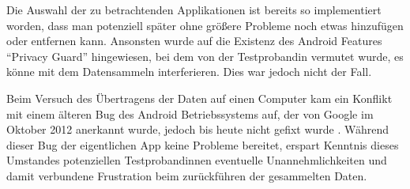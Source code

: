 Die Auswahl der zu betrachtenden Applikationen ist bereits so implementiert worden, dass man potenziell später ohne größere Probleme noch etwas hinzufügen oder entfernen kann.
Ansonsten wurde auf die Existenz des Android Features "`Privacy Guard"' hingewiesen, bei dem von der Testprobandin vermutet wurde, es könne mit dem Datensammeln interferieren.
Dies war jedoch nicht der Fall.
\par
Beim Versuch des Übertragens der Daten auf einen Computer kam ein Konflikt mit einem älteren Bug des Android Betriebssystems auf, der von Google im Oktober 2012 anerkannt wurde, jedoch bis heute nicht gefixt wurde
\cite{androidbug}.
Während dieser Bug der eigentlichen App keine Probleme bereitet, erspart Kenntnis dieses Umstandes potenziellen Testprobandinnen eventuelle Unannehmlichkeiten und damit verbundene Frustration beim zurückführen der gesammelten Daten.


